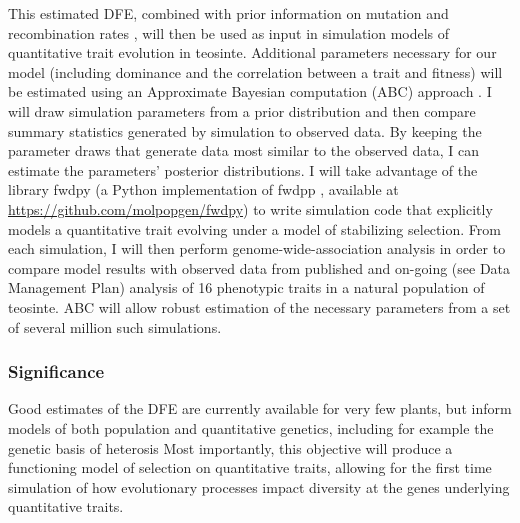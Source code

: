 This estimated DFE, combined with prior information on mutation \citep{Clark:2005} and recombination rates \citep{Rodgers-Melnick:2014}, will then be used as input in simulation models of quantitative trait evolution in teosinte. Additional parameters necessary for our model (including dominance and the correlation between a trait and fitness) will be estimated using an Approximate Bayesian computation (ABC) approach \citep{Beaumont:2002ue}. I will draw simulation parameters from a prior distribution and then compare summary statistics generated by simulation to observed data. By keeping the parameter draws that generate data most similar to the observed data, I can estimate the parameters' posterior distributions. I will take advantage of the library fwdpy (a Python implementation of fwdpp \citealt{Thornton:2014kn}, available at \url{https://github.com/molpopgen/fwdpy}) to write simulation code that explicitly models a quantitative trait evolving under a model of stabilizing selection. From each simulation, I will then perform genome-wide-association analysis in order to compare model results with observed data from published \citep{Weber:2009} and on-going (see Data Management Plan) analysis of 16 phenotypic traits in a natural population of teosinte. ABC will allow robust estimation of the necessary parameters from a set of several million such simulations. \vspace{-4ex}

\subsubsection*{Significance}\vspace{-1ex}
Good estimates of the DFE are currently available for very few plants, but inform models of both population and quantitative genetics, including for example the genetic basis of heterosis \citep{Mezmouk:2013wq}
Most importantly, this objective will produce a functioning model of selection on quantitative traits, allowing for the first time simulation of how evolutionary processes impact diversity at the genes underlying quantitative traits. \vspace{-1ex}

